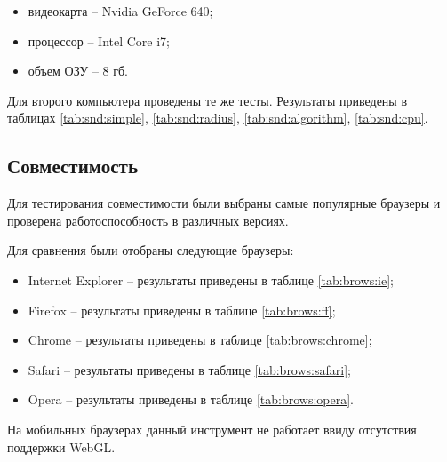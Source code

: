 \begin{itemize} 
  \item видеокарта -- Nvidia GeForce 640;
  \item процессор -- Intel Core i7;
  \item объем ОЗУ -- 8 гб.
\end{itemize} 

Для второго компьютера проведены те же тесты. Результаты приведены в таблицах
\ref{tab:snd:simple}, \ref{tab:snd:radius}, \ref{tab:snd:algorithm}, \ref{tab:snd:cpu}.

\subsection{Совместимость}

Для тестирования совместимости были выбраны самые популярные браузеры и
проверена работоспособность в различных версиях. 

Для сравнения были отобраны следующие браузеры:

\begin{itemize}
  \item Internet Explorer -- результаты приведены в таблице \ref{tab:brows:ie};
  \item Firefox -- результаты приведены в таблице \ref{tab:brows:ff};
  \item Chrome -- результаты приведены в таблице \ref{tab:brows:chrome};
  \item Safari -- результаты приведены в таблице \ref{tab:brows:safari};
  \item Opera -- результаты приведены в таблице \ref{tab:brows:opera}.
\end{itemize}

На мобильных браузерах данный инструмент не работает ввиду отсутствия поддержки
WebGL.


